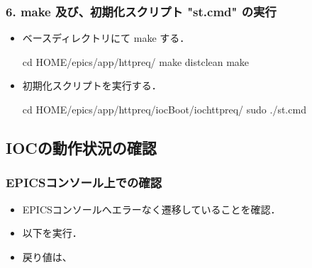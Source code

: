\documentclass[letterpaper,10pt,dvipdfmx]{sphinxmanual}
\begin{document}
\subsubsection{6. make 及び、初期化スクリプト "st.cmd" の実行}
\label{\detokenize{epics/rst/example1__httpRequest_to_Google:make-st-cmd}}\begin{itemize}
\item {} 
ベースディレクトリにて make する．

\begin{sphinxVerbatim}[commandchars=\\\{\}]
\PYGZdl{} cd \PYGZdl{}HOME/epics/app/http\PYGZus{}req/
\PYGZdl{} make distclean
\PYGZdl{} make
\end{sphinxVerbatim}

\item {} 
初期化スクリプトを実行する．

\begin{sphinxVerbatim}[commandchars=\\\{\}]
\PYGZdl{} cd \PYGZdl{}HOME/epics/app/http\PYGZus{}req/iocBoot/iochttp\PYGZus{}req/
\PYGZdl{} sudo ./st.cmd
\end{sphinxVerbatim}

\end{itemize}


\subsection{IOCの動作状況の確認}
\label{\detokenize{epics/rst/example1__httpRequest_to_Google:id6}}

\subsubsection{EPICSコンソール上での確認}
\label{\detokenize{epics/rst/example1__httpRequest_to_Google:epics}}\begin{itemize}
\item {} 
EPICSコンソールへエラーなく遷移していることを確認．

\item {} 
以下を実行．

\begin{sphinxVerbatim}[commandchars=\\\{\}]
   
  
\end{sphinxVerbatim}

\item {} 
戻り値は、

\begin{sphinxVerbatim}[commandchars=\\\{\}]
         
\end{sphinxVerbatim}

\end{itemize}
\end{document}
